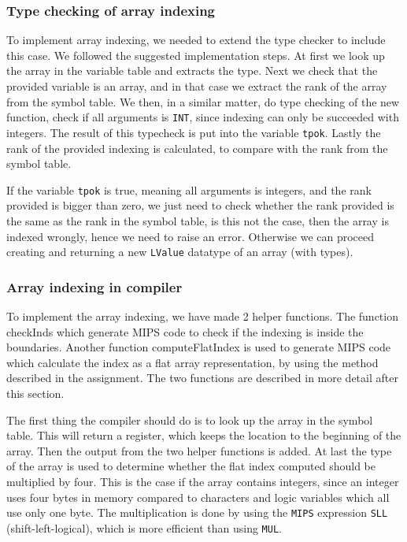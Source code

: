 \documentclass[10pt]{article}
\begin{document}
\subsubsection{Type checking of array indexing}
To implement array indexing, we needed to extend the type checker to include this case. We followed the suggested implementation steps. At first we look up the array in the variable table and extracts the type. Next we check that the provided variable is an array, and in that case we extract the rank of the array from the symbol table. We then, in a similar matter, do type checking of the new function, check if all arguments is \texttt{INT}, since indexing can only be succeeded with integers. The result of this typecheck is put into the variable \texttt{tpok}. Lastly the rank of the provided indexing is calculated, to compare with the rank from the symbol table.

If the variable \texttt{tpok} is true, meaning all arguments is integers, and the rank provided is bigger than zero, we just need to check whether the rank provided is the same as the rank in the symbol table, is this not the case, then the array is indexed wrongly, hence we need to raise an error. Otherwise we can proceed creating and returning a new \texttt{LValue} datatype of an array (with types).

\subsubsection{Array indexing in compiler}
To implement the array indexing, we have made 2 helper functions. The function checkInds which generate MIPS code to check if the indexing is inside the boundaries. Another function computeFlatIndex is used to generate MIPS code which calculate the index as a flat array representation, by using the method described in the assignment. The two functions are described in more detail after this section.

The first thing the compiler should do is to look up the array in the symbol table. This will return a register, which keeps the location to the beginning of the array. Then the output from the two helper functions is added. At last the type of the array is used to determine whether the flat index computed should be multiplied by four. This is the case if the array contains integers, since an integer uses four bytes in memory compared to characters and logic variables which all use only one byte. The multiplication is done by using the \texttt{MIPS} expression \texttt{SLL} (shift-left-logical), which is more efficient than using \texttt{MUL}.
\end{document}
